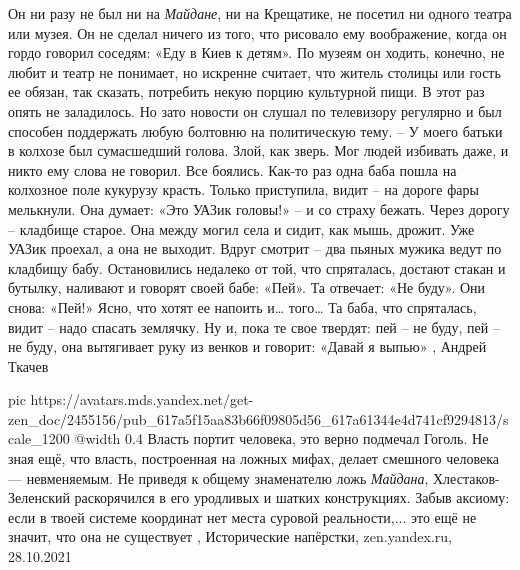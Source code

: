 Он ни разу не был ни на \emph{Майдане}, ни на Крещатике, не посетил ни одного
театра или музея. Он не сделал ничего из того, что рисовало ему воображение,
когда он гордо говорил соседям: «Еду в Киев к детям». По музеям он ходить,
конечно, не любит и театр не понимает, но искренне считает, что житель столицы
или гость ее обязан, так сказать, потребить некую порцию культурной пищи. В
этот раз опять не заладилось. Но зато новости он слушал по телевизору регулярно
и был способен поддержать любую болтовню на политическую тему.  – У моего
батьки в колхозе был сумасшедший голова. Злой, как зверь. Мог людей избивать
даже, и никто ему слова не говорил. Все боялись. Как-то раз одна баба пошла на
колхозное поле кукурузу красть. Только приступила, видит – на дороге фары
мелькнули. Она думает: «Это УАЗик головы!» – и со страху бежать. Через дорогу –
кладбище старое. Она между могил села и сидит, как мышь, дрожит. Уже УАЗик
проехал, а она не выходит. Вдруг смотрит – два пьяных мужика ведут по кладбищу
бабу. Остановились недалеко от той, что спряталась, достают стакан и бутылку,
наливают и говорят своей бабе: «Пей». Та отвечает: «Не буду». Они снова: «Пей!»
Ясно, что хотят ее напоить и… того… Та баба, что спряталась, видит – надо
спасать землячку. Ну и, пока те свое твердят: пей – не буду, пей – не буду, она
вытягивает руку из венков и говорит: «Давай я выпью»
, Андрей Ткачев

\ifcmt
  pic https://avatars.mds.yandex.net/get-zen_doc/2455156/pub_617a5f15aa83b66f09805d56_617a61344e4d741cf9294813/scale_1200
  @width 0.4
\fi
Власть портит человека, это верно подмечал Гоголь. Не зная ещё, что власть,
построенная на ложных мифах, делает смешного человека — невменяемым. Не приведя
к общему знаменателю ложь \emph{Майдана}, Хлестаков-Зеленский раскорячился в его
уродливых и шатких конструкциях. Забыв аксиому: если в твоей системе координат
нет места суровой реальности,... это ещё не значит, что она не существует
, 
Исторические напёрстки, zen.yandex.ru, 28.10.2021

